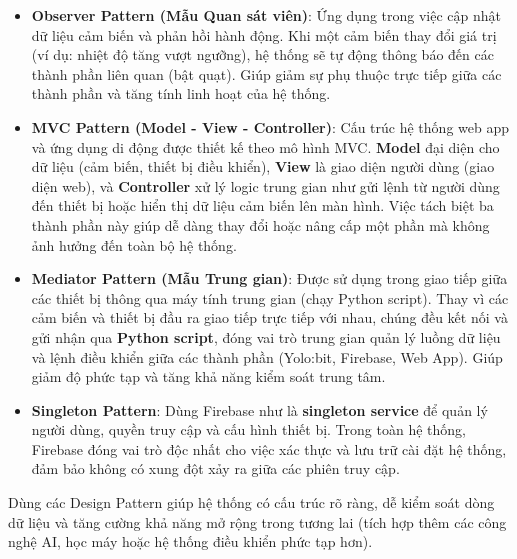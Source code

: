 \begin{itemize}
    \item \textbf{Observer Pattern (Mẫu Quan sát viên)}:
          Ứng dụng trong việc cập nhật dữ liệu cảm biến và phản hồi hành động. Khi một cảm biến thay đổi giá trị (ví dụ: nhiệt độ tăng vượt ngưỡng), hệ thống sẽ tự động thông báo đến các thành phần liên quan (bật quạt). Giúp giảm sự phụ thuộc trực tiếp giữa các thành phần và tăng tính linh hoạt của hệ thống.

    \item \textbf{MVC Pattern (Model - View - Controller)}:
          Cấu trúc hệ thống web app và ứng dụng di động được thiết kế theo mô hình MVC. \textbf{Model} đại diện cho dữ liệu (cảm biến, thiết bị điều khiển), \textbf{View} là giao diện người dùng (giao diện web), và \textbf{Controller} xử lý logic trung gian như gửi lệnh từ người dùng đến thiết bị hoặc hiển thị dữ liệu cảm biến lên màn hình. Việc tách biệt ba thành phần này giúp dễ dàng thay đổi hoặc nâng cấp một phần mà không ảnh hưởng đến toàn bộ hệ thống.

    \item \textbf{Mediator Pattern (Mẫu Trung gian)}:
          Được sử dụng trong giao tiếp giữa các thiết bị thông qua máy tính trung gian (chạy Python script). Thay vì các cảm biến và thiết bị đầu ra giao tiếp trực tiếp với nhau, chúng đều kết nối và gửi nhận qua \textbf{Python script}, đóng vai trò trung gian quản lý luồng dữ liệu và lệnh điều khiển giữa các thành phần (Yolo:bit, Firebase, Web App). Giúp giảm độ phức tạp và tăng khả năng kiểm soát trung tâm.

    \item \textbf{Singleton Pattern}:
          Dùng Firebase như là \textbf{singleton service} để quản lý người dùng, quyền truy cập và cấu hình thiết bị. Trong toàn hệ thống, Firebase đóng vai trò độc nhất cho việc xác thực và lưu trữ cài đặt hệ thống, đảm bảo không có xung đột xảy ra giữa các phiên truy cập.
\end{itemize}

Dùng các Design Pattern giúp hệ thống có cấu trúc rõ ràng, dễ kiểm soát dòng dữ liệu và tăng cường khả năng mở rộng trong tương lai (tích hợp thêm các công nghệ AI, học máy hoặc hệ thống điều khiển phức tạp hơn).
